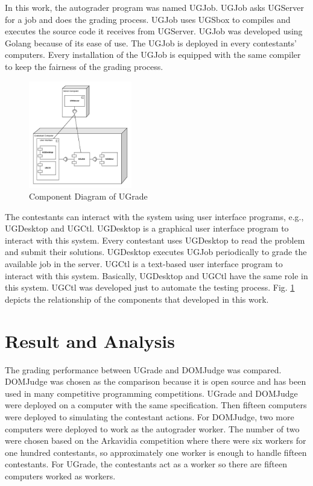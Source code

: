 \documentclass[conference,a4paper]{IEEEtran}
\begin{document}
In this work, the autograder program was named UGJob. UGJob asks UGServer for a job and does the grading process. UGJob uses UGSbox to compiles and executes the source code it receives from UGServer. UGJob was developed using Golang because of its ease of use. The UGJob is deployed in every contestants' computers. Every installation of the UGJob is equipped with the same compiler to keep the fairness of the grading process.

\begin{figure}[htbp]
\centerline{\includegraphics[width=0.4\textwidth]{images/paper-component.jpeg}}
\caption{Component Diagram of UGrade}
\label{component}
\end{figure}

The contestants can interact with the system using user interface programs, e.g., UGDesktop and UGCtl. UGDesktop is a graphical user interface program to interact with this system. Every contestant uses UGDesktop to read the problem and submit their solutions. UGDesktop executes UGJob periodically to grade the available job in the server. UGCtl is a text-based user interface program to interact with this system. Basically, UGDesktop and UGCtl have the same role in this system. UGCtl was developed just to automate the testing process. Fig. \ref{component} depicts the relationship of the components that developed in this work.

\section{Result and Analysis}

The grading performance between UGrade and DOMJudge was compared. DOMJudge was chosen as the comparison because it is open source and has been used in many competitive programming competitions. UGrade and DOMJudge were deployed on a computer with the same specification. Then fifteen computers were deployed to simulating the contestant actions. For DOMJudge, two more computers were deployed to work as the autograder worker. The number of two were chosen based on the Arkavidia competition where there were six workers for one hundred contestants, so approximately one worker is enough to handle fifteen contestants. For UGrade, the contestants act as a worker so there are fifteen computers worked as workers.
\end{document}
